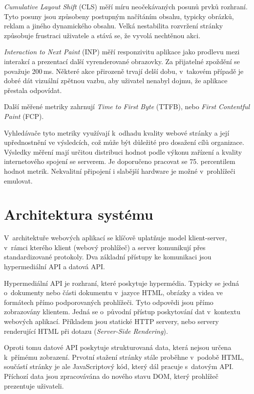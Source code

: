 \emph{Cumulative Layout Shift} (CLS) měří míru neočekávaných posunů prvků rozhraní.
Tyto posuny jsou způsobeny postupným načítáním obsahu, typicky obrázků, reklam a jiného dynamického obsahu.
Velká nestabilita rozvržení stránky způsobuje frustraci uživatele a stává se, že vyvolá nechtěnou akci.

\emph{Interaction to Next Paint} (INP) měří responzivitu aplikace jako prodlevu mezi interakcí a prezentací další vyrenderované obrazovky.
Za přijatelné zpoždění se považuje 200\,ms.
Některé akce přirozeně trvají delší dobu, v~takovém případě je dobré dát vizuální zpětnou vazbu, aby uživatel nenabyl dojmu, že aplikace přestala odpovídat. 

Další měřené metriky zahrnují \emph{Time to First Byte} (TTFB), nebo \emph{First Contentful Paint} (FCP).

Vyhledávače tyto metriky využívají k~odhadu kvality webové stránky a její upřednostnění ve výsledcích, což může být důležité pro dosažení cílů organizace.
Výsledky měření mají určitou distribuci hodnot podle výkonu zařízení a kvality internetového spojení se serverem.
Je doporučeno pracovat se 75. percentilem hodnot metrik.
Nekvalitní připojení i slabější hardware je možné v~prohlížeči emulovat. 
\cite{coreWebVitals}


\section{Architektura systému}

V~architektuře webových aplikací se klíčově uplatňuje model klient-server, v~rámci kterého klient (webový prohlížeč) a server komunikují přes standardizované protokoly.
Dva základní přístupy ke komunikaci jsou hypermediální API a datová API.

Hypermediální API je rozhraní, které poskytuje hypermédia.
Typicky se jedná o~dokumenty nebo části dokumentu v~jazyce HTML, obrázky a videa ve formátech přímo podporovaných prohlížeči.
Tyto odpovědi jsou přímo zobrazovány klientem.
Jedná se o~původní přístup poskytování dat v~kontextu webových aplikací.
Příkladem jsou statické HTTP servery, nebo servery renderující HTML při dotazu (\emph{Server-Side Rendering}).

Oproti tomu datové API poskytuje strukturovaná data, která nejsou určena k~přímému zobrazení.
Prvotní stažení stránky stále proběhne v~podobě HTML, součástí stránky je ale JavaScriptový kód, který dál pracuje s~datovým API.
Příchozí data jsou zpracovávána do nového stavu DOM, který prohlížeč prezentuje uživateli.

